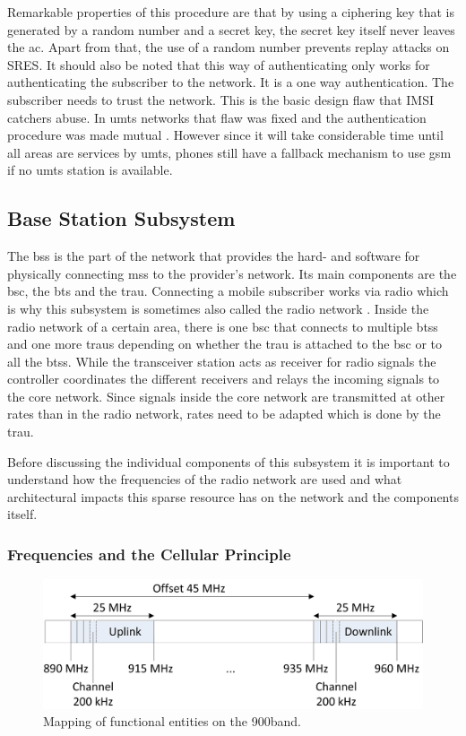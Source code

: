 Remarkable properties of this procedure are that by using a ciphering key that is generated by a random number and a secret key, the secret key itself never leaves the \gls{ac}.
Apart from that, the use of a random number prevents replay attacks on SRES.
It should also be noted that this way of authenticating only works for authenticating the subscriber to the network.
It is a one way authentication.
The subscriber needs to trust the network.
This is the basic design flaw that IMSI catchers abuse.
In \gls{umts} networks that flaw was fixed and the authentication procedure was made mutual \cite{kommsys2006}.
However since it will take considerable time until all areas are services by \gls{umts}, phones still have a fallback mechanism to use \gls{gsm} if no \gls{umts} station is available. 

\subsection{Base Station Subsystem}
\label{sec:bss}
The \gls{bss} is the part of the network that provides the hard- and software for physically connecting \glspl{ms} to the provider's network.
Its main components are the \gls{bsc}, the \gls{bts} and the \gls{trau}.
Connecting a mobile subscriber works via radio which is why this subsystem is sometimes also called the radio network \cite{kommsys2006}.
Inside the radio network of a certain area, there is one \gls{bsc} that connects to multiple \glspl{bts} and one more \glspl{trau} depending on whether the \gls{trau} is attached to the \gls{bsc} or to all the \glspl{bts}.
While the transceiver station acts as receiver for radio signals the controller coordinates the different receivers and relays the incoming signals  to the core network.
Since signals inside the core network are transmitted at other rates than in the radio network, rates need to be adapted which is done by the \gls{trau}.

Before discussing the individual components of this subsystem it is important to understand how the frequencies of the radio network are used and what architectural impacts this sparse resource has on the network and the components itself.

\subsubsection{Frequencies and the Cellular Principle}
\begin{figure}
\centering
\includegraphics{../Images/Mapping}
\caption{Mapping of functional entities on the 900\MHz band.}
\label{fig:frequency}
\end{figure}

